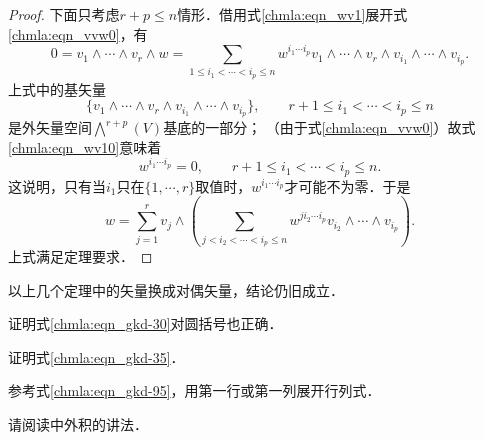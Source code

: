 \begin{proof}
    下面只考虑$r+p\leqslant  n$情形．借用式\eqref{chmla:eqn_wv1}展开式\eqref{chmla:eqn_vvw0}，有
    \begin{equation}\label{chmla:eqn_wv10}
        0=v_1 \wedge \cdots \wedge v_r \wedge w=  \sum_{1\leqslant {i_1} < \cdots <i_p  \leqslant n }
        w^{i_1\cdots i_p} v_1 \wedge \cdots \wedge v_r \wedge v_{i_1}\wedge \cdots \wedge v_{i_p} .
    \end{equation}
    上式中的基矢量
    \begin{equation}
        \{v_1 \wedge \cdots \wedge v_r \wedge v_{i_1}\wedge \cdots \wedge v_{i_p}\},
        \qquad r+1 \leqslant i_1<\cdots<i_p\leqslant n
    \end{equation}
    是外矢量空间$\bigwedge^{r+p}(V)$基底的一部分；
    （由于式\eqref{chmla:eqn_vvw0}）故式\eqref{chmla:eqn_wv10}意味着
    \begin{equation}
        w^{i_1\cdots i_p} = 0, \qquad r+1 \leqslant i_1<\cdots<i_p\leqslant n .
    \end{equation}
    这说明，只有当$i_1$只在$\{1,\cdots,r\}$取值时，$w^{i_1\cdots i_p}$才可能不为零．于是
    \begin{equation}
        w = \sum_{j=1}^{r}v_j \wedge \left(
        \sum_{j< {i_2} < \cdots <i_p  \leqslant n }
        w^{ji_2\cdots i_p} v_{i_2}\wedge \cdots \wedge v_{i_p} \right).
    \end{equation}
    上式满足定理要求．
\end{proof}


以上几个定理中的矢量换成对偶矢量，结论仍旧成立．

\begin{exercise}
	证明式\eqref{chmla:eqn_gkd-30}对圆括号也正确．
\end{exercise}

\begin{exercise}
	证明式\eqref{chmla:eqn_gkd-35}．
\end{exercise}


\begin{exercise}
	参考式\eqref{chmla:eqn_gkd-95}，用第一行或第一列展开行列式．
\end{exercise}


\begin{exercise}
	请阅读\textcite[\S 2.3]{cc2001-zh}中外积的讲法．
\end{exercise}



